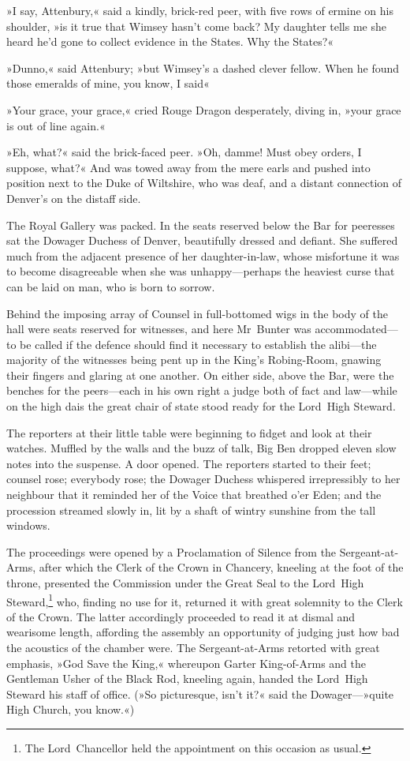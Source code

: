 »I say, Attenbury,« said a kindly, brick-red peer, with five rows of ermine on his shoulder, »is it true that Wimsey hasn't come back?  My daughter tells me she heard he'd gone to collect evidence in the States. Why the States?«

»Dunno,« said Attenbury; »but Wimsey's a dashed clever fellow. When he found those emeralds of mine, you know, I said\longdash«

»Your grace, your grace,« cried Rouge Dragon desperately, diving in, »your grace is out of line again.«

»Eh, what?« said the brick-faced peer. »Oh, damme! Must obey orders, I suppose, what?« And was towed away from the mere earls and pushed into position next to the Duke of Wiltshire, who was deaf, and a distant connection of Denver's on the distaff side.

The Royal Gallery was packed. In the seats reserved below the Bar for peeresses sat the Dowager Duchess of Denver, beautifully dressed and defiant. She suffered much from the adjacent presence of her daughter-in-law, whose misfortune it was to become disagreeable when she was unhappy—perhaps the heaviest curse that can be laid on man, who is born to sorrow.

Behind the imposing array of Counsel in full-bottomed wigs in the body of the hall were seats reserved for witnesses, and here Mr~Bunter was accommodated—to be called if the defence should find it necessary to establish the alibi—the majority of the witnesses being pent up in the King's Robing-Room, gnawing their fingers and glaring at one another.  On either side, above the Bar, were the benches for the peers—each in his own right a judge both of fact and law—while on the high dais the great chair of state stood ready for the Lord~High Steward.

The reporters at their little table were beginning to fidget and look at their watches. Muffled by the walls and the buzz of talk, Big Ben dropped eleven slow notes into the suspense. A door opened.  The reporters started to their feet; counsel rose; everybody rose; the Dowager Duchess whispered irrepressibly to her neighbour that it reminded her of the Voice that breathed o'er Eden; and the procession streamed slowly in, lit by a shaft of wintry sunshine from the tall windows.

The proceedings were opened by a Proclamation of Silence from the Sergeant-at-Arms, after which the Clerk of the Crown in Chancery, kneeling at the foot of the throne, presented the Commission under the Great Seal to the Lord~High Steward,\footnote{The Lord~Chancellor held the appointment on this occasion as usual.} who, finding no use for it, returned it with great solemnity to the Clerk of the Crown. The latter accordingly proceeded to read it at dismal and wearisome length, affording the assembly an opportunity of judging just how bad the acoustics of the chamber were. The Sergeant-at-Arms retorted with great emphasis, »God Save the King,« whereupon Garter King-of-Arms and the Gentleman Usher of the Black Rod, kneeling again, handed the Lord~High Steward his staff of office. (»So picturesque, isn't it?« said the Dowager—»quite High Church, you know.«)

